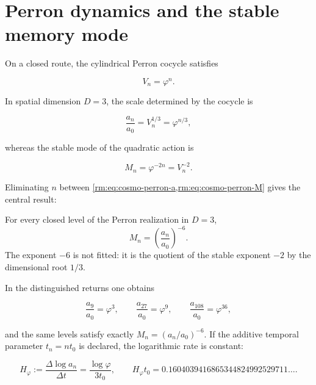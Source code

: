 \section{Perron dynamics and the stable memory mode}

On a closed route, the cylindrical Perron cocycle satisfies

\begin{equation}
V_n=\varphi^n.
\label{rm:eq:cosmo-perron-V}
\end{equation}

In spatial dimension \(D=3\), the scale determined by the cocycle is

\begin{equation}
\frac{a_n}{a_0}=V_n^{1/3}=\varphi^{n/3},
\label{rm:eq:cosmo-perron-a}
\end{equation}

whereas the stable mode of the quadratic action is

\begin{equation}
M_n=\varphi^{-2n}=V_n^{-2}.
\label{rm:eq:cosmo-perron-M}
\end{equation}

Eliminating \(n\) between \cref{rm:eq:cosmo-perron-a,rm:eq:cosmo-perron-M} gives the
central result:

\begin{theorem}
For every closed level of the Perron realization in \(D=3\),
\begin{equation}
\boxed{
M_n=\left(\frac{a_n}{a_0}\right)^{-6}.}
\label{rm:eq:cosmo-minus-six}
\end{equation}
The exponent \(-6\) is not fitted: it is the quotient of the stable exponent
\(-2\) by the dimensional root \(1/3\).
\end{theorem}

In the distinguished returns one obtains

\[
\frac{a_9}{a_0}=\varphi^3,
\qquad
\frac{a_{27}}{a_0}=\varphi^9,
\qquad
\frac{a_{108}}{a_0}=\varphi^{36},
\]

and the same levels satisfy exactly
\(M_n=(a_n/a_0)^{-6}\). If the additive temporal parameter \(t_n=nt_0\) is declared, the
logarithmic rate is constant:

\begin{equation}
H_\varphi
:=\frac{\Delta\log a_n}{\Delta t}
=\frac{\log\varphi}{3t_0},
\qquad
H_\varphi t_0
=0.1604039416865344824992529711\ldots.
\label{rm:eq:cosmo-Hphi}
\end{equation}

